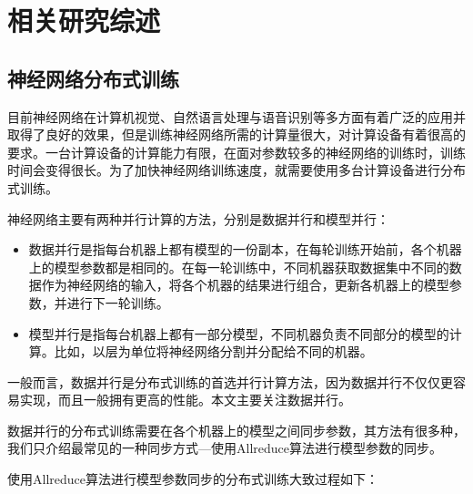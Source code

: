\chapter{相关研究综述}
\label{chap2}

\section{神经网络分布式训练}
目前神经网络在计算机视觉、自然语言处理与语音识别等多方面有着广泛的应用并取得了良好的效果，但是训练神经网络所需的计算量很大，对计算设备有着很高的要求。一台计算设备的计算能力有限，在面对参数较多的神经网络的训练时，训练时间会变得很长。为了加快神经网络训练速度，就需要使用多台计算设备进行分布式训练。

神经网络主要有两种并行计算的方法，分别是数据并行和模型并行：
\begin{itemize}
    \item 数据并行是指每台机器上都有模型的一份副本，在每轮训练开始前，各个机器上的模型参数都是相同的。在每一轮训练中，不同机器获取数据集中不同的数据作为神经网络的输入，将各个机器的结果进行组合，更新各机器上的模型参数，并进行下一轮训练。
    \item 模型并行是指每台机器上都有一部分模型，不同机器负责不同部分的模型的计算。比如，以层为单位将神经网络分割并分配给不同的机器。
\end{itemize}

一般而言，数据并行是分布式训练的首选并行计算方法，因为数据并行不仅仅更容易实现，而且一般拥有更高的性能。本文主要关注数据并行。

数据并行的分布式训练需要在各个机器上的模型之间同步参数，其方法有很多种，我们只介绍最常见的一种同步方式---使用Allreduce算法进行模型参数的同步。

使用Allreduce算法进行模型参数同步的分布式训练大致过程如下：

